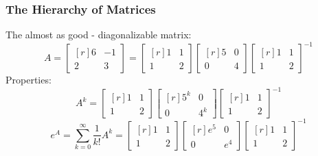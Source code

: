 \documentclass[10pt]{beamer}
\begin{document}
\begin{frame}
\frametitle{The Hierarchy of Matrices}
The almost as good - diagonalizable matrix: 
\[
A = \begin{bmatrix*}[r]
6&-1\\
2&3
\end{bmatrix*} =  \begin{bmatrix*}[r]
1&1\\
1&2
\end{bmatrix*}
\begin{bmatrix*}[r]
5&0\\
0&4
\end{bmatrix*}
\begin{bmatrix*}[r]
1&1\\
1&2
\end{bmatrix*}^{-1}
\]
\pause
Properties:
\[
A^k =  \begin{bmatrix*}[r]
1&1\\
1&2
\end{bmatrix*}
\begin{bmatrix*}[r]
5^k&0\\
0&4^k
\end{bmatrix*}
\begin{bmatrix*}[r]
1&1\\
1&2
\end{bmatrix*}^{-1}
\]
\pause
\[
e^A =  \sum_{k = 0}^\infty \frac{1}{k!}A^k= \begin{bmatrix*}[r]
1&1\\
1&2
\end{bmatrix*}
\begin{bmatrix*}[r]
e^5&0\\
0&e^4
\end{bmatrix*}
\begin{bmatrix*}[r]
1&1\\
1&2
\end{bmatrix*}^{-1}
\]
\end{frame}
\end{document}
